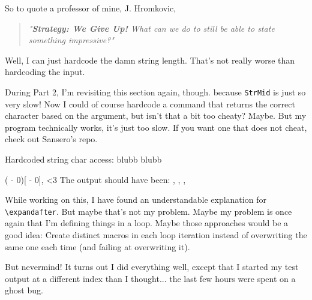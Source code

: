 \documentclass{article} \usepackage[utf8]{inputenc}
\newcommand{\code}[1]{\colorbox{codebggray}{{\texttt{#1}}}}
\begin{document}
So to quote a professor of mine, J. Hromkovic, 
\begin{quote}\textit{"\textbf{Strategy: We Give Up!} What can we do to still be able to state something impressive?"}\end{quote}
Well, I can just hardcode the damn string length. That's not really worse than hardcoding the input.

During Part 2, I'm revisiting this section again, though. because \code{StrMid} is just so very slow! Now I could of course hardcode a command that returns the correct character based on the argument, but isn't that a bit too cheaty? Maybe. But my program technically works, it's just too slow. If you want one that does not cheat, check out Sansero's repo.

\def\totalpos{3}
Hardcoded string char access: blubb \lucidcharat{\the\numexpr \totalpos - 0} blubb

\setcounter{tmpbctr}{-1}
\loop
{}
\edef\tmpinput{\the\numexpr \value{tmpbctr} - 0}
\def\tmpchar{\expandafter\lucidcharat\tmpinput}
(\tmpinput )[\tmpchar],
\ifnum \value{tmpbctr}<3
\repeat
\newline
The output should have been: , , ,

While working on this, I have found an understandable explanation for \code{\textbackslash expandafter}.
But maybe that's not my problem. Maybe my problem is once again that I'm defining things in a loop. Maybe those approaches would be a good idea: Create distinct macros in each loop iteration instead of overwriting the same one each time (and failing at overwriting it).

But nevermind! It turns out I did everything well, except that I started my test output at a different index than I thought... the last few hours were spent on a ghost bug.

\makeatletter
\def\einput#1{\@@input #1 \space}
\newcommand{\showexpanded}[1]{%
  \everyeof{\expandafter\@gobble\noexpand}%
  \long\edef\@tempcontents{#1}%
  \show\@tempcontents
}
\newcommand{\justexpanded}[1]{%
  \everyeof{\expandafter\@gobble\noexpand}%
  \long\edef\@tempcontents{#1}%
  \@tempcontents
}
\makeatother
\def\testingfile{\einput{testing.tex}}
%
\end{document}
